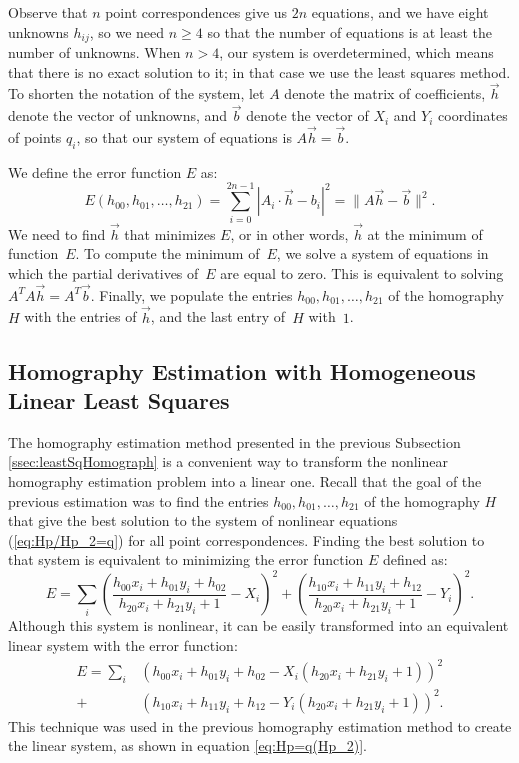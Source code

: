 \documentclass[11pt, oneside, reqno]{book}
\begin{document}
Observe that $n$ point correspondences give us $2n$ equations, and we have eight unknowns $h_{ij}$, so we need $n \ge 4$ so that the number of equations is at least the number of unknowns. When $n > 4$, our system is overdetermined, which means that there is no exact solution to it; in that case we use the least squares method. 
To shorten the notation of the system, let $A$ denote the matrix of coefficients, $\vec{h}$ denote the vector of unknowns, and $\vec{b}$ denote the vector of $X_i$ and $Y_i$ coordinates of points $q_i$, so that our system of equations is $A\vec{h} = \vec{b}$.

We define the error function $E$ as:
\[
E\left(h_{00}, h_{01}, \dots, h_{21}\right)
= \sum_{i=0}^{2n-1} \left| A_i \cdot \vec{h} - b_i \right|^2 
= \| A\vec{h} - \vec{b} \|^2.
\]
We need to find $\vec{h}$ that minimizes $E$, or in other words, $\vec{h}$ at the minimum of function~$E$. To compute the minimum of~$E$, we solve a system of equations in which the partial derivatives of~$E$ are equal to zero. This is equivalent to solving $A^T A \vec{h} = A^T \vec{b}$. Finally, we populate the entries $h_{00}, h_{01}, \dots, h_{21}$ of the homography~$H$ with the entries of $\vec{h}$, and the last entry of~$H$ with~$1$.





\subsection{Homography Estimation with Homogeneous Linear Least Squares}
\label{ssec:hEstimateHomogeneousLS}

The homography estimation method presented in the previous Subsection \ref{ssec:leastSqHomograph} is a convenient way to transform the nonlinear homography estimation problem into a linear one. 
Recall that the goal of the previous estimation was to find the entries $h_{00}, h_{01}, \dots, h_{21}$ of the homography $H$ that give the best solution to the system of nonlinear equations (\ref{eq:Hp/Hp_2=q}) for all point correspondences. Finding the best solution to that system is equivalent to minimizing the error function $E$ defined as:
\[
	E = \sum_i 
	\left( \frac{h_{00}x_i + h_{01}y_i + h_{02}}{h_{20}x_i + h_{21}y_i + 1} - X_i \right)^2
	+ 
	\left( \frac{h_{10}x_i + h_{11}y_i + h_{12}}{h_{20}x_i + h_{21}y_i + 1} - Y_i \right)^2.
\]
Although this system is nonlinear, it can be easily transformed into an equivalent linear system with the error function:
\begin{align*}
	E = \sum_i
	&\left( 
	h_{00}x_i + h_{01}y_i + h_{02} 
	- X_i \left(h_{20}x_i + h_{21}y_i + 1\right)
	\right)^2 \\
	+
	&\left( 
	h_{10}x_i + h_{11}y_i + h_{12} 
	- Y_i \left(h_{20}x_i + h_{21}y_i + 1\right)
	\right)^2.
\end{align*}
This technique was used in the previous homography estimation method to create the linear system, as shown in equation \ref{eq:Hp=q(Hp_2)}.
\end{document}
